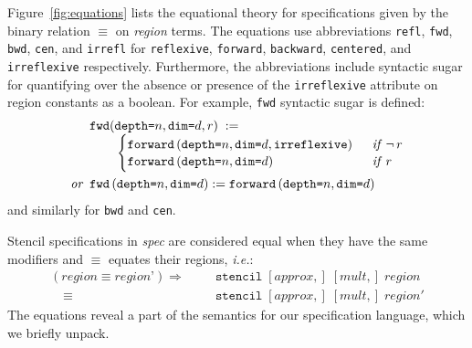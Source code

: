 \documentclass[9pt,preprint]{sigplanconf}
\theoremstyle{definition}
\newcommand{\ie}{\emph{i.e.}}
\newcommand{\term}[1]{\texttt{#1}}
\newcommand{\stenFwd}[3]{\term{forward} \, (\term{depth=}#1,
  \term{dim=}#2{#3})}
\newcommand{\irrefl}{\texttt{irreflexive}}
\newcommand{\stenFwdS}[2]{\term{fwd} \, (\term{depth=}#1,
  \term{dim=}#2)}
\newcommand{\irreflS}{\texttt{irrefl}}
\newcommand{\stenFwdSR}[3]{\term{fwd} (\term{depth=}#1,
  \term{dim=}#2, #3)}
\begin{document}
Figure~\ref{fig:equations} lists the equational theory for
specifications given by the binary relation $\equiv$
on \emph{region} terms. The equations use abbreviations
\term{refl}, \term{fwd}, \term{bwd}, \term{cen}, and \irreflS{}
for \term{reflexive}, \term{forward}, \term{backward},
\term{centered}, and \irrefl{} respectively. Furthermore, the abbreviations include syntactic sugar
for quantifying over the absence or presence of the \irrefl{}
attribute on region constants as a boolean. For example,
\term{fwd} syntactic sugar is defined:
\begin{align*}
\hspace{-0.25em}
& \stenFwdSR{n}{d}{r}
\; := \; \\[-0.4em]
& \qquad \begin{cases}
\stenFwd{n}{d}{, \irrefl} & \;\;\textit{if} \;\, \neg \, r \\[-0.1em]
\stenFwd{n}{d}{}  & \;\;\textit{if} \;\,  r
\end{cases} \\
\textit{or} \;\;
& \stenFwdS{n}{d} := \stenFwd{n}{d}{}
\end{align*}
%
and similarly for \term{bwd} and \term{cen}.

Stencil specifications in \textit{spec} are considered
equal when they have the same modifiers and $\equiv$ equates
their regions, \ie{}:
\begin{align*}
(\textit{region} \equiv \textit{region'}) 
 \Rightarrow \quad\;\; & \texttt{stencil} \; [\textit{approx},] \; [\textit{mult},] \;
\textit{region} \\[-0.4em]
\quad \equiv \; & \texttt{stencil} \; [\textit{approx},] \;
            [\textit{mult},] \; \textit{region}'
\end{align*}
%
The equations reveal a part of the semantics for our
specification language, which we briefly unpack.
\end{document}

